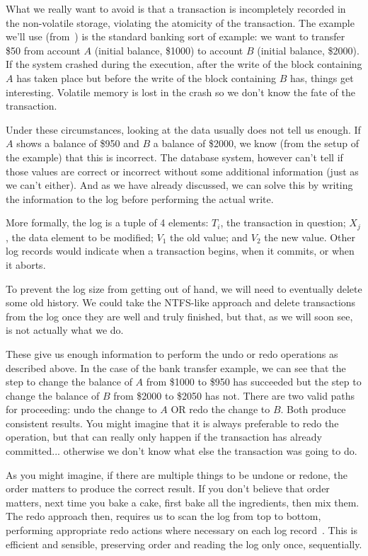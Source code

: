 What we really want to avoid is that a transaction is incompletely recorded in the non-volatile storage, violating the atomicity of the transaction. The example we'll use (from~\cite{dsc}) is the standard banking sort of example: we want to transfer \$50 from account $A$ (initial balance, \$1000) to account $B$ (initial balance, \$2000). If the system crashed during the execution, after the write of the block containing $A$ has taken place but before the write of the block containing $B$ has, things get interesting. Volatile memory is lost in the crash so we don't know the fate of the transaction.

Under these circumstances, looking at the data usually does not tell us enough. If $A$ shows a balance of \$950 and $B$ a balance of \$2000, we know (from the setup of the example) that this is incorrect. The database system, however can't tell if those values are correct or incorrect without some additional information (just as we can't either). And as we have already discussed, we can solve this by writing the information to the log before performing the actual write.

More formally, the log is a tuple of 4 elements: $T_{i}$, the transaction in question; $X_{j}$, the data element to be modified; $V_{1}$ the old value; and $V_{2}$ the new value. Other log records would indicate when a transaction begins, when it commits, or when it aborts. 

To prevent the log size from getting out of hand, we will need to eventually delete some old history. We could take the NTFS-like approach and delete transactions from the log once they are well and truly finished, but that, as we will soon see, is not actually what we do. 

These give us enough information to perform the undo or redo operations as described above. In the case of the bank transfer example, we can see that the step to change the balance of $A$ from \$1000 to \$950 has succeeded but the step to change the balance of $B$ from \$2000 to \$2050 has not. There are two valid paths for proceeding: undo the change to $A$ OR redo the change to $B$. Both produce consistent results. You might imagine that it is always preferable to redo the operation, but that can really only happen if the transaction has already committed... otherwise we don't know what else the transaction was going to do.

As you might imagine, if there are multiple things to be undone or redone, the order matters to produce the correct result. If you don't believe that order matters, next time you bake a cake, first bake all the ingredients, then mix them. The redo approach then, requires us to scan the log from top to bottom, performing appropriate redo actions where necessary on each log record~\cite{dsc}. This is efficient and sensible, preserving order and reading the log only once, sequentially.

